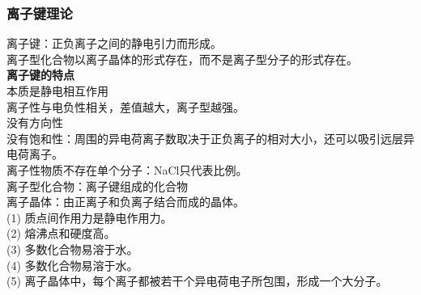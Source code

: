 \documentclass[utf8,a4paper,12pt]{ctexart}
\begin{document}
\subsubsection{离子键理论}
离子键：正负离子之间的静电引力而形成。\\
离子型化合物以离子晶体的形式存在，而不是离子型分子的形式存在。\\
{\bf 离子键的特点}\\
本质是静电相互作用\\
离子性与电负性相关，差值越大，离子型越强。\\
没有方向性\\
没有饱和性：周围的异电荷离子数取决于正负离子的相对大小，还可以吸引远层异电荷离子。\\
离子性物质不存在单个分子：NaCl只代表比例。\\
离子型化合物：离子键组成的化合物\\
离子晶体：由正离子和负离子结合而成的晶体。\\
(1) 质点间作用力是静电作用力。\\
(2) 熔沸点和硬度高。\\
(3) 多数化合物易溶于水。\\
(4) 多数化合物易溶于水。\\
(5) 离子晶体中，每个离子都被若干个异电荷电子所包围，形成一个大分子。\\
\end{document}
